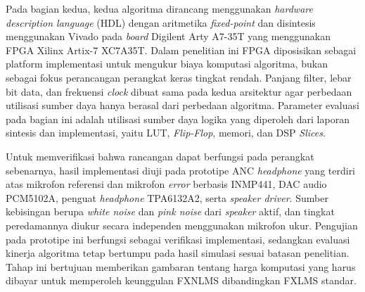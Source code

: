 Pada bagian kedua, kedua algoritma dirancang menggunakan \emph{hardware description language} (HDL) dengan aritmetika \emph{fixed-point} dan disintesis menggunakan Vivado pada \emph{board} Digilent Arty A7-35T yang menggunakan FPGA Xilinx Artix-7 XC7A35T. Dalam penelitian ini FPGA diposisikan sebagai platform implementasi untuk mengukur biaya komputasi algoritma, bukan sebagai fokus perancangan perangkat keras tingkat rendah. Panjang filter, lebar bit data, dan frekuensi \emph{clock} dibuat sama pada kedua arsitektur agar perbedaan utilisasi sumber daya hanya berasal dari perbedaan algoritma. Parameter evaluasi pada bagian ini adalah utilisasi sumber daya logika yang diperoleh dari laporan sintesis dan implementasi, yaitu LUT, \emph{Flip-Flop}, memori, dan DSP \emph{Slices}.

Untuk memverifikasi bahwa rancangan dapat berfungsi pada perangkat sebenarnya, hasil implementasi diuji pada prototipe ANC \emph{headphone} yang terdiri atas mikrofon referensi dan mikrofon \emph{error} berbasis INMP441, DAC audio PCM5102A, penguat \emph{headphone} TPA6132A2, serta \emph{speaker driver}. Sumber kebisingan berupa \emph{white noise} dan \emph{pink noise} dari \emph{speaker} aktif, dan tingkat peredamannya diukur secara independen menggunakan mikrofon ukur. Pengujian pada prototipe ini berfungsi sebagai verifikasi implementasi, sedangkan evaluasi kinerja algoritma tetap bertumpu pada hasil simulasi sesuai batasan penelitian. Tahap ini bertujuan memberikan gambaran tentang harga komputasi yang harus dibayar untuk memperoleh keunggulan FXNLMS dibandingkan FXLMS standar.

